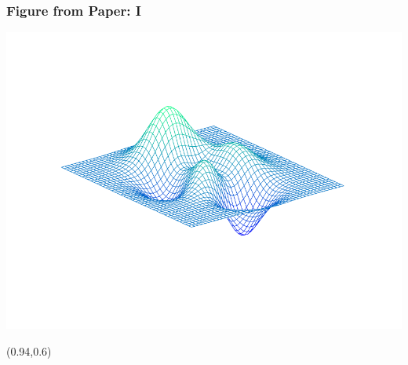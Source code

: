 \documentclass[12pt,aspectratio=169,xcolor=dvipsnames,hyperref={colorlinks=true,linkcolor=blue,citecolor=black}]{beamer}
\begin{document}
\begin{frame}[label=figureex]
	\frametitle{Figure from Paper: I}
	\begin{center}
		\includegraphics[trim={0cm 0cm 0cm 1cm},clip,height=0.85\textheight,width=\textwidth,keepaspectratio]{../Figures/exfigure1}
	\end{center}
	
	\begin{textblock*}{3cm}(0.94\textwidth,0.6\textheight)	%
		\hyperlink{examples}{}
	\end{textblock*}
\end{frame}
\end{document}
